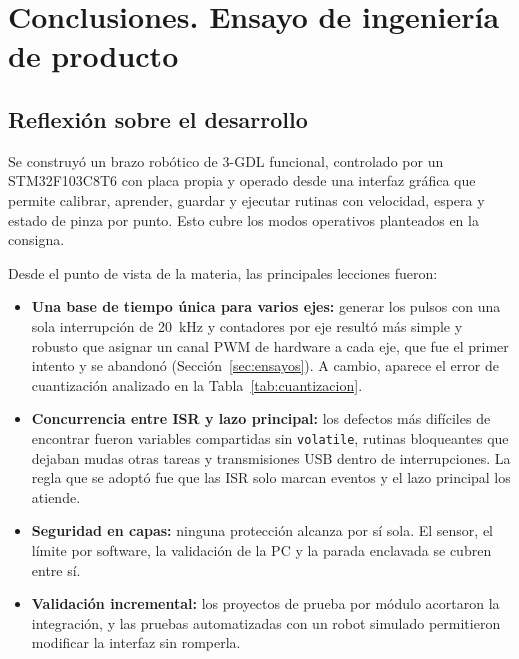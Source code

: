\section{Conclusiones. Ensayo de ingeniería de producto}\label{sec:conclusiones}

\subsection{Reflexión sobre el desarrollo}
Se construyó un brazo robótico de 3-GDL funcional, controlado por un STM32F103C8T6 con placa
propia y operado desde una interfaz gráfica que permite calibrar, aprender, guardar y ejecutar
rutinas con velocidad, espera y estado de pinza por punto. Esto cubre los modos operativos
planteados en la consigna.

Desde el punto de vista de la materia, las principales lecciones fueron:
\begin{itemize}
  \item \textbf{Una base de tiempo única para varios ejes:} generar los pulsos con una sola
        interrupción de \SI{20}{\kilo\hertz} y contadores por eje resultó más simple y robusto
        que asignar un canal PWM de hardware a cada eje, que fue el primer intento y se
        abandonó (Sección~\ref{sec:ensayos}). A cambio, aparece el error de cuantización
        analizado en la Tabla~\ref{tab:cuantizacion}.
  \item \textbf{Concurrencia entre ISR y lazo principal:} los defectos más difíciles de
        encontrar fueron variables compartidas sin \texttt{volatile}, rutinas bloqueantes que
        dejaban mudas otras tareas y transmisiones USB dentro de interrupciones. La regla que
        se adoptó fue que las ISR solo marcan eventos y el lazo principal los atiende.
  \item \textbf{Seguridad en capas:} ninguna protección alcanza por sí sola. El sensor, el
        límite por software, la validación de la PC y la parada enclavada se cubren entre sí.
  \item \textbf{Validación incremental:} los proyectos de prueba por módulo acortaron la
        integración, y las pruebas automatizadas con un robot simulado permitieron modificar la
        interfaz sin romperla.
\end{itemize}

